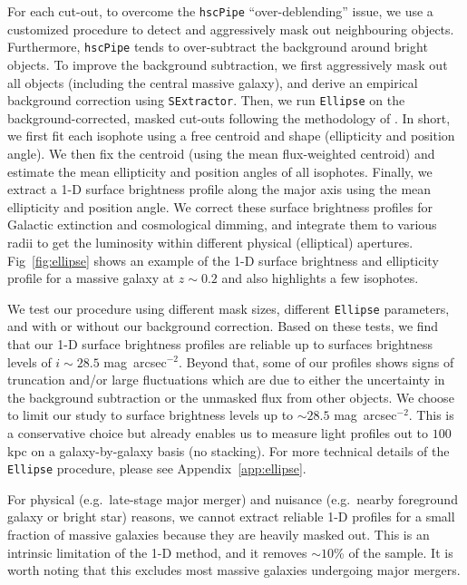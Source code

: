 \documentclass[a4paper,fleqn,usenatbib]{mnras}
\def\sb{mag~arcsec$^{-2}$}
\def\rbcg{\texttt{cenHighMh}}
\def\nbcg{\texttt{cenLowMh}}
\begin{document}
    For each cut-out, to overcome the \texttt{hscPipe} ``over-deblending'' issue, 
    we use a customized procedure to detect and aggressively mask out
    neighbouring objects. 
    Furthermore, \texttt{hscPipe} tends to over-subtract the background around 
    bright objects. 
    To improve the background subtraction, we first aggressively mask 
    out all objects (including the central massive galaxy), and derive an 
    empirical background correction using \texttt{SExtractor}.
    Then, we run \texttt{Ellipse} on the background-corrected, masked cut-outs 
    following the methodology of \citet{Li2012}. 
    In short, we first fit each isophote using a free centroid and shape 
    (ellipticity and position angle). 
    We then fix the centroid (using the mean flux-weighted centroid) and estimate
    the mean ellipticity and position angles of all isophotes. 
    Finally, we extract a 1-D surface brightness profile along the major axis using 
    the mean ellipticity and position angle. 
    We correct these surface brightness profiles for Galactic extinction and 
    cosmological dimming, and integrate them to various radii to get the luminosity 
    within different physical (elliptical) apertures. 
    Fig~\ref{fig:ellipse} shows an example of the 1-D surface brightness and 
    ellipticity profile for a massive galaxy at $z{\sim}0.2$ and also highlights 
    a few isophotes.    

    We test our procedure using different mask sizes, different \texttt{Ellipse} 
    parameters, and with or without our background correction. 
    Based on these tests, we find that our 1-D surface brightness profiles are reliable 
    up to surfaces brightness levels of $i{\sim}28.5$ \sb. 
    Beyond that, some of our profiles shows signs of truncation and/or large 
    fluctuations which are due to either the uncertainty in the background 
    subtraction or the unmasked flux from other objects.
    We choose to limit our study to surface brightness levels up to ${\sim} 28.5$ \sb. 
    This is a conservative choice but already enables us to measure light profiles 
    out to $100$ kpc on a galaxy-by-galaxy basis (no stacking). 
    For more technical details of the \texttt{Ellipse} procedure, please see 
    Appendix~\ref{app:ellipse}.

    
    For physical (e.g.\ late-stage major merger) and nuisance (e.g.\ nearby foreground 
    galaxy or bright star) reasons, we cannot extract reliable 1-D profiles for a small 
    fraction of massive galaxies because they are heavily masked out. 
    This is an intrinsic limitation of the 1-D method, and it removes ${\sim}10$\% of 
    the sample.
    It is worth noting that this excludes most massive galaxies undergoing major mergers. 
    
\end{document}
